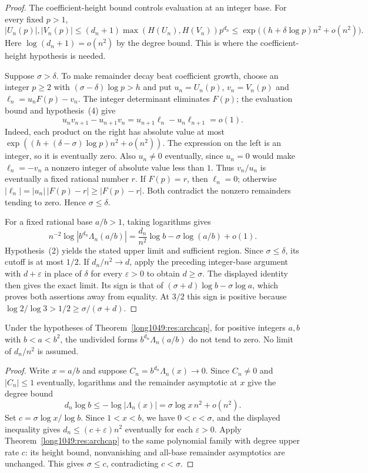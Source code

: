 \begin{proof}
The coefficient-height bound controls evaluation at an integer base.
For every fixed $p>1$,
\[
 |U_n(p)|,|V_n(p)|
 \le (d_n+1)\max(H(U_n),H(V_n))p^{d_n}
 \le \exp\bigl((h+\delta\log p)n^2+o(n^2)\bigr).
\]
Here $\log(d_n+1)=o(n^2)$ by the degree bound. This is where the
coefficient-height hypothesis is needed.

Suppose $\sigma>\delta$. To make remainder decay beat coefficient growth,
choose an integer $p\ge2$ with $(\sigma-\delta)\log p>h$ and put
$u_n=U_n(p)$, $v_n=V_n(p)$ and $\ell_n=u_nF(p)-v_n$.
The integer determinant eliminates $F(p)$; the evaluation bound
and hypothesis~(4) give
\[
 u_nv_{n+1}-u_{n+1}v_n=u_{n+1}\ell_n-u_n\ell_{n+1}=o(1).
\]
Indeed, each product on the right has absolute value at most
$\exp((h+(\delta-\sigma)\log p)n^2+o(n^2))$.
The expression on the left is an integer, so it is eventually zero.
Also $u_n\ne0$ eventually, since $u_n=0$ would make $\ell_n=-v_n$
a nonzero integer of absolute value less than $1$.
Thus $v_n/u_n$ is eventually a fixed rational number $r$.
If $F(p)=r$, then $\ell_n=0$; otherwise
$|\ell_n|=|u_n|\,|F(p)-r|\ge|F(p)-r|$.
Both contradict the nonzero remainders tending to zero. Hence
$\sigma\le\delta$.

For a fixed rational base $a/b>1$, taking logarithms gives
\[
 n^{-2}\log|b^{d_n}\Lambda_n(a/b)|
 =\frac{d_n}{n^2}\log b-\sigma\log(a/b)+o(1).
\]
Hypothesis~(2) yields the stated upper limit and sufficient region.
Since $\sigma\le\delta$, its cutoff is at most $1/2$.
If $d_n/n^2\to d$, apply the preceding integer-base argument with
$d+\varepsilon$ in place of $\delta$ for every $\varepsilon>0$ to obtain
$d\ge\sigma$. The displayed identity then gives the exact limit.
Its sign is that of $(\sigma+d)\log b-\sigma\log a$, which proves
both assertions away from equality. At $3/2$ this sign is positive
because $\log2/\log3>1/2\ge\sigma/(\sigma+d)$.
\end{proof}

\begin{corollary}
\label{long1049:cor:no-decay-below-square}
Under the hypotheses of Theorem~\ref{long1049:res:archcap}, for positive integers
$a,b$ with $b<a<b^2$, the undivided forms $b^{d_n}\Lambda_n(a/b)$ do not
tend to zero.  No limit of $d_n/n^2$ is assumed.
\end{corollary}
\begin{proof}
Write $x=a/b$ and suppose $C_n=b^{d_n}\Lambda_n(x)\to0$.
Since $C_n\ne0$ and $|C_n|\le1$ eventually, logarithms and the
remainder asymptotic at $x$ give the degree bound
\[
 d_n\log b\le-\log|\Lambda_n(x)|
       =\sigma\log x\,n^2+o(n^2).
\]
Set $c=\sigma\log x/\log b$.  Since $1<x<b$, we have $0<c<\sigma$,
and the displayed inequality gives $d_n\le(c+\varepsilon)n^2$ eventually
for each $\varepsilon>0$. Apply Theorem~\ref{long1049:res:archcap} to
the same polynomial family with degree upper rate $c$: its height bound,
nonvanishing and all-base remainder asymptotics are unchanged. This gives
$\sigma\le c$, contradicting $c<\sigma$.
\end{proof}


